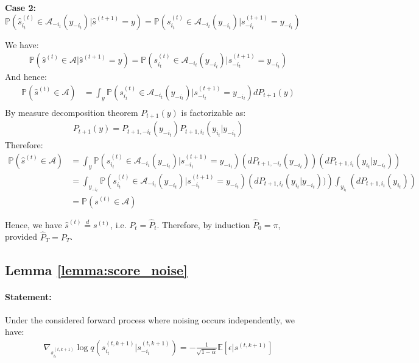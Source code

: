 \textbf{Case 2:} $ \mathbb{P}\left(\hat{s}^{(t)}_{i_t} \in \mathcal{A}_{-i_t}\left(y_{-i_t} \right)|\hat{s}^{(t+1)} =  y \right) = \mathbb{P}\left({s}^{(t)}_{i_t} \in \mathcal{A}_{-i_t}\left(y_{-i_t} \right)|s^{(t+1)}_{-i_t} = y_{-i_t} \right)  $

We have:
\begin{align*}
    \mathbb{P}\left(\hat{s}^{(t)} \in \mathcal{A}|\hat{s}^{(t+1)} = y \right) = \mathbb{P}\left({s}^{(t)}_{i_t} \in \mathcal{A}_{-i_t}\left(y_{-i_t} \right)|s^{(t+1)}_{-i_t} = y_{-i_t} \right)
\end{align*}
And hence:
\begin{align*}
    \mathbb{P}(\hat{s}^{(t)} \in \mathcal{A}) &= \int_y  \mathbb{P}\left({s}^{(t)}_{i_t} \in \mathcal{A}_{-i_t}\left(y_{-i_t} \right)|s^{(t+1)}_{-i_t} = y_{-i_t} \right) d{P}_{t+1}(y) \\
\end{align*}
By measure decomposition theorem ${P}_{t+1}(y)$ is factorizable as:
\begin{align*}
    {P}_{t+1}(y) = {P}_{t+1, -i_t}(y_{-i_t}){P}_{t+1, i_t}(y_{i_t}|y_{-i_t})
\end{align*}
Therefore:
\begin{align*}
    \mathbb{P}(\hat{s}^{(t)} \in \mathcal{A}) &= \int_y  \mathbb{P}\left({s}^{(t)}_{i_t} \in \mathcal{A}_{-i_t}\left(y_{-i_t} \right)|s^{(t+1)}_{-i_t} = y_{-i_t} \right) \left(d{P}_{t+1, -i_t}(y_{-i_t})\right) \left(d{P}_{t+1, i_t}(y_{i_t}|y_{-i_t})\right) \\
    &= \int_{y_{-i_t}} \mathbb{P}\left({s}^{(t)}_{i_t} \in \mathcal{A}_{-i_t}\left(y_{-i_t} \right)|s^{(t+1)}_{-i_t} = y_{-i_t} \right) \left(d{P}_{t+1, i_t}(y_{i_t}|y_{-i_t}))\right) \int_{y_{i_t}} \left(d{P}_{t+1, i_t}(y_{i_t})\right) \\
     &= \mathbb{P}({s}^{(t)} \in \mathcal{A})
\end{align*}

Hence, we have  $\hat{s}^{(t)} \overset{d}{=} {s}^{(t)} $, i.e. ${P}_{t} = \hat{P}_{t}$. Therefore, by induction $\hat{P}_{0} = \pi$, provided $\hat{P}_{T} = {P}_{T}$.

\newpage
\subsection{Lemma \ref{lemma:score_noise}}

\paragraph{Statement:}
Under the considered forward process where noising occurs independently, we have:
 \begin{align*}
     \nabla_{{s}_{i_t}^{(t, k+1)}} \log q({s}_{i_t}^{(t, k+1)} | {s}_{-i_t}^{(t, k+1)} )  = -\frac{1}{\sqrt{1-\bar{\alpha}}} \mathbb{E} \left[ \epsilon | {s}^{(t,k+1)} \right]
 \end{align*}

